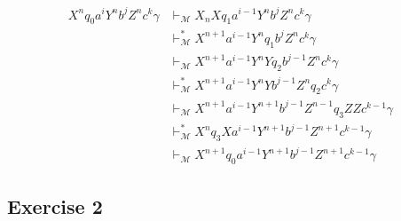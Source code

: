 \documentclass[12pt]{article}
\begin{document}
  \begin{align*}
    X^nq_0a^iY^nb^jZ^nc^k\gamma &\vdash_\mathcal{M} X_nXq_1a^{i-1}Y^nb^jZ^nc^k\gamma\\
    &\vdash^*_\mathcal{M} X^{n+1}a^{i-1}Y^nq_1b^jZ^nc^k\gamma \tag*{(L1 by taking \(x = a\) and \(Y\))}\\
    &\vdash_\mathcal{M} X^{n+1}a^{i-1}Y^nYq_2b^{j-1}Z^nc^k\gamma\\
    &\vdash^*_\mathcal{M} X^{n+1}a^{i-1}Y^nYb^{j-1}Z^nq_2c^k\gamma \tag*{(L2 by taking \(x = b\) and \(Z\))}\\
    &\vdash_\mathcal{M} X^{n+1}a^{i-1}Y^{n+1}b^{j-1}Z^{n-1}q_3ZZc^{k-1}\gamma \tag*{(* we don't look into cases for simplicity)}\\
    &\vdash^*_\mathcal{M} X^{n}q_3Xa^{i-1}Y^{n+1}b^{j-1}Z^{n+1}c^{k-1}\gamma \tag*{(L3 by taking \(x = Z, b, Y, a\))}\\
    &\vdash_\mathcal{M} X^{n+1}q_0a^{i-1}Y^{n+1}b^{j-1}Z^{n+1}c^{k-1}\gamma
  \end{align*}

\subsection*{Exercise 2}
\end{document}
